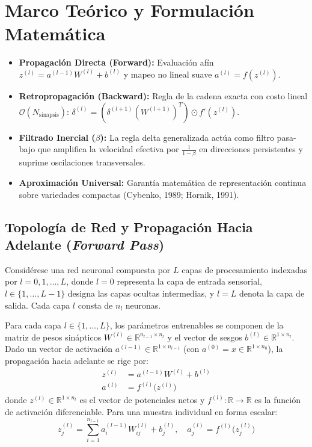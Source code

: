 \documentclass{article}
\begin{document}
\section{Marco Teórico y Formulación Matemática}
\label{sec:teoria}

\begin{takeawaybox}
\begin{itemize}
    \item \textbf{Propagación Directa (Forward):} Evaluación afín $z^{(l)} = a^{(l-1)}W^{(l)} + b^{(l)}$ y mapeo no lineal suave $a^{(l)} = f(z^{(l)})$.
    \item \textbf{Retropropagación (Backward):} Regla de la cadena exacta con costo lineal $\mathcal{O}(N_{\text{sinapsis}})$: $\delta^{(l)} = (\delta^{(l+1)}(W^{(l+1)})^T) \odot f'(z^{(l)})$.
    \item \textbf{Filtrado Inercial ($\beta$):} La regla delta generalizada actúa como filtro pasa-bajo que amplifica la velocidad efectiva por $\frac{1}{1-\beta}$ en direcciones persistentes y suprime oscilaciones transversales.
    \item \textbf{Aproximación Universal:} Garantía matemática de representación continua sobre variedades compactas (Cybenko, 1989; Hornik, 1991).
\end{itemize}
\end{takeawaybox}

\subsection{Topología de Red y Propagación Hacia Adelante (\textit{Forward Pass})}

Considérese una red neuronal compuesta por $L$ capas de procesamiento indexadas por $l = 0, 1, \dots, L$, donde $l = 0$ representa la capa de entrada sensorial, $l \in \{1, \dots, L-1\}$ designa las capas ocultas intermedias, y $l = L$ denota la capa de salida. Cada capa $l$ consta de $n_l$ neuronas.

Para cada capa $l \in \{1, \dots, L\}$, los parámetros entrenables se componen de la matriz de pesos sinápticos $W^{(l)} \in \mathbb{R}^{n_{l-1} \times n_l}$ y el vector de sesgos $b^{(l)} \in \mathbb{R}^{1 \times n_l}$. Dado un vector de activación $a^{(l-1)} \in \mathbb{R}^{1 \times n_{l-1}}$ (con $a^{(0)} = x \in \mathbb{R}^{1 \times n_0}$), la propagación hacia adelante se rige por:
\begin{align}
    z^{(l)} &= a^{(l-1)} W^{(l)} + b^{(l)} \label{eq:potencial_neto} \\
    a^{(l)} &= f^{(l)}\big(z^{(l)}\big) \label{eq:activacion}
\end{align}
donde $z^{(l)} \in \mathbb{R}^{1 \times n_l}$ es el vector de potenciales netos y $f^{(l)}: \mathbb{R} \to \mathbb{R}$ es la función de activación diferenciable. Para una muestra individual en forma escalar:
\begin{equation}
    z_j^{(l)} = \sum_{i=1}^{n_{l-1}} a_i^{(l-1)} W_{ij}^{(l)} + b_j^{(l)}, \quad a_j^{(l)} = f^{(l)}\big(z_j^{(l)}\big)
\end{equation}
\end{document}
